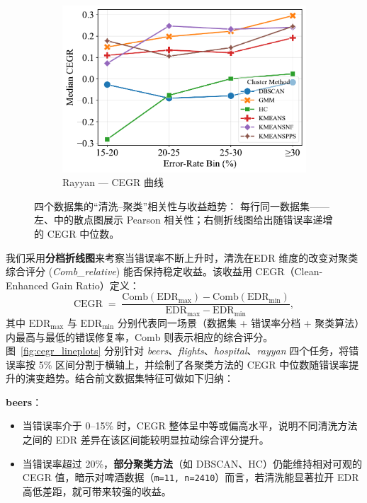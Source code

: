 \documentclass[10pt]{article} %
\numberwithin{equation}{section}
\begin{document}
\begin{enumerate}[label=(\alph*)]
\begin{figure}[H]
\begin{subfigure}[b]{0.33\linewidth}
    \includegraphics[width=\linewidth]{figures/6.4.3graph/CEGR_5pct_rayyan.pdf}
    \caption{Rayyan — CEGR 曲线}
    \label{fig:ra_cegr}
  \end{subfigure}

  \caption{四个数据集的“清洗–聚类”相关性与收益趋势：  
           每行同一数据集——左、中的散点图展示 Pearson 相关性；右侧折线图给出随错误率递增的 CEGR 中位数。}
  \label{fig:scatter_line_grid}
\end{figure}


我们采用\textbf{分档折线图}来考察当错误率不断上升时，清洗在EDR 维度的改变对聚类综合评分 (\textit{Comb\_relative}) 能否保持稳定收益。该收益用 CEGR（Clean-Enhanced Gain Ratio）定义：
\[
  \mathrm{CEGR} \;=\; \frac{\mathrm{Comb}(\mathrm{EDR}_{\max}) - \mathrm{Comb}(\mathrm{EDR}_{\min})}{\mathrm{EDR}_{\max} - \mathrm{EDR}_{\min}},
\]
其中 \(\mathrm{EDR}_{\max}\) 与 \(\mathrm{EDR}_{\min}\) 分别代表同一场景（数据集 + 错误率分档 + 聚类算法）内最高与最低的错误修复率，\(\mathrm{Comb}\) 则表示相应的综合评分。图~\ref{fig:cegr_lineplots} 分别针对 \textit{beers}、\textit{flights}、\textit{hospital}、\textit{rayyan} 四个任务，将错误率按 5\% 区间分割于横轴上，并绘制了各聚类方法的 CEGR 中位数随错误率提升的演变趋势。结合前文数据集特征可做如下归纳：

\textbf{beers}：
    \begin{itemize}
        \item 当错误率介于 0--15\% 时，CEGR 整体呈中等或偏高水平，说明不同清洗方法之间的 EDR 差异在该区间能较明显拉动综合评分提升。
        \item 当错误率超过 20\%，\textbf{部分聚类方法}（如 DBSCAN、HC）仍能维持相对可观的 CEGR 值，暗示对啤酒数据（\texttt{m=11, n=2410}）而言，若清洗能显著拉开 EDR 高低差距，就可带来较强的收益。
    \end{itemize}


\end{enumerate}
\end{document}
